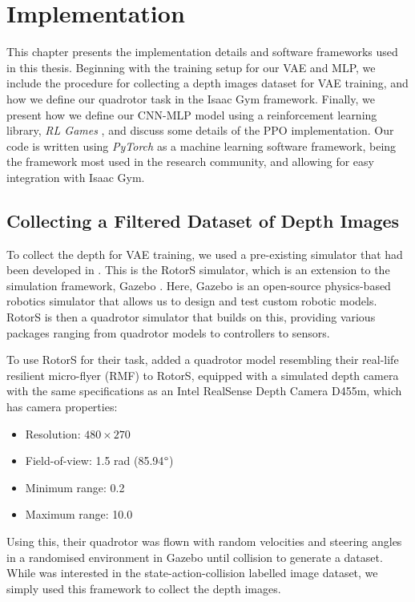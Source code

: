 \chapter{Implementation}
\label{chap:6_implementation}

This chapter presents the implementation details and software frameworks used in this thesis. Beginning with the training setup for our VAE and MLP, we include the procedure for collecting a depth images dataset for VAE training, and how we define our quadrotor task in the Isaac Gym framework. Finally, we present how we define our CNN-MLP model using a reinforcement learning library, \textit{RL Games} \cite{rl-games2022}, and discuss some details of the PPO implementation.
Our code is written using \textit{PyTorch} as a machine learning software framework, being the framework most used in the research community, and allowing for easy integration with Isaac Gym.

\section{Collecting a Filtered Dataset of Depth Images}
To collect the depth for VAE training, we used a pre-existing simulator that had been developed in \cite{deepCollisionPredictorOracle}. This is the RotorS \cite{RotorS_Furrer2016} simulator, which is an extension to the simulation framework, Gazebo \cite{Gazebo}. Here, Gazebo is an open-source physics-based robotics simulator that allows us to design and test custom robotic models. RotorS is then a quadrotor simulator that builds on this, providing various packages ranging from quadrotor models to controllers to sensors. 

To use RotorS for their task, \cite{deepCollisionPredictorOracle} added a quadrotor model resembling their real-life resilient micro-flyer (RMF) to RotorS, equipped with a simulated depth camera with the same specifications as an Intel RealSense Depth Camera D455m, which has camera properties:
\begin{itemize}
    \item Resolution: $480 \times 270$
    \item Field-of-view: 1.5 rad (85.94$\degree$)
    \item Minimum range: 0.2
    \item Maximum range: 10.0
\end{itemize}

Using this, their quadrotor was flown with random velocities and steering angles in a randomised environment in Gazebo until collision to generate a dataset. While \cite{deepCollisionPredictorOracle} was interested in the state-action-collision labelled image dataset, we simply used this framework to collect the depth images.

